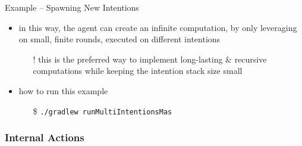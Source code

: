 \documentclass[presentation]{beamer}\mode<presentation>{\usetheme{AMSBolognaFC}}
\begin{document}
\begin{frame}[c, allowframebreaks]{Example \theJasonExample{} -- Spawning New Intentions}
\begin{itemize}
        \framebreak
        
        \item in this way, the agent can create an \alert{infinite} computation, by only leveraging on small, \alert{finite} rounds, executed on different intentions
        \begin{itemize}
            \item[!] this is the preferred way to implement long-lasting \& recursive computations while keeping the intention \alert{stack size} small 
        \end{itemize}
        
        \vspace{.3cm}
        
        \item how to run this example
        \begin{itemize}
            \item[\$] \texttt{./gradlew run\alert{MultiIntentions}Mas}
        \end{itemize}
        
    \end{itemize}
\end{frame}

\subsubsection{Internal Actions}
\end{document}
